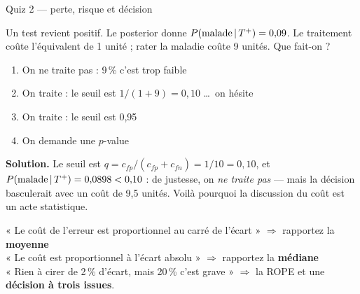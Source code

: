 \begin{frame}{Quiz 2 --- perte, risque et décision}
\begin{qbox}
Un test revient positif. Le posterior donne $P(\text{malade} \,\vert\, T^+) = 0{,}09$.
Le traitement coûte l'équivalent de 1 unité ; rater la maladie coûte 9 unités.
Que fait-on ?
\vspace{2mm}
\begin{enumerate}
  \item[(A)] On ne traite pas : 9\,\% c'est trop faible
  \item[(B)] On traite : le seuil est $1/(1+9) = 0{,}10$ \dots\ on hésite \checkmark
  \item[(C)] On traite : le seuil est 0,95
  \item[(D)] On demande une $p$-value
\end{enumerate}
\vspace{2mm}
\textcolor{byBlue}{\textbf{Solution.}} Le seuil est $q = c_{fp}/(c_{fp}+c_{fn}) = 1/10 = 0{,}10$,
et $P(\text{malade} \,\vert\, T^+) = 0{,}0898 < 0{,}10$ : de justesse, on
\emph{ne traite pas} --- mais la décision basculerait avec un coût de 9,5 unités.
Voilà pourquoi la discussion du coût est un acte statistique.
\end{qbox}
\vspace{1mm}
\begin{kbox}
« Le coût de l'erreur est proportionnel au carré de l'écart »
$\Rightarrow$ rapportez la \textbf{moyenne}\\
« Le coût est proportionnel à l'écart absolu » $\Rightarrow$ rapportez la
\textbf{médiane}\\
« Rien à cirer de 2\,\% d'écart, mais 20\,\% c'est grave » $\Rightarrow$ la
ROPE et une \textbf{décision à trois issues}.
\end{kbox}
\end{frame}

